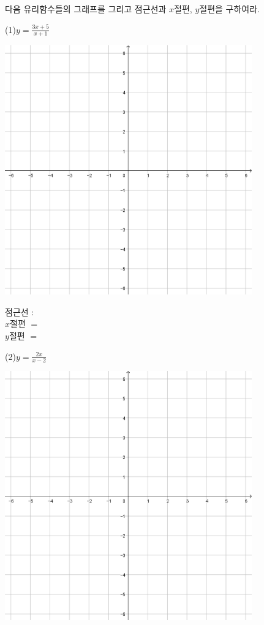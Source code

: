 \documentclass{oblivoir}
\begin{document}
\newpage
%
\prob{}
다음 유리함수들의 그래프를 그리고 점근선과 \(x\)절편, \(y\)절편을 구하여라.\label{rational9}
\par\bigskip\noindent
(1)\:\:\(y=\frac{3x+5}{x+1}\)
\begin{center}
\includegraphics[width=0.8\textwidth]{66grid}
\end{center}
\hspace{0.65\textwidth}\parbox[t]{0.3\textwidth}{점근선 :\\[20pt]\(x\)절편 \(=\)\\[20pt]\(y\)절편 \(=\)}
\newpage
(2)\:\:\(y=\frac{2x}{x-2}\)
\begin{center}
\includegraphics[width=0.8\textwidth]{66grid}
\end{center}
\end{document}
